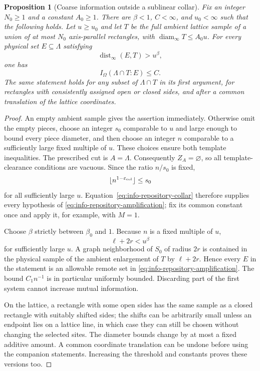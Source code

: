 \documentclass[11pt]{article}
\numberwithin{equation}{section}
\newtheorem{proposition}[theorem]{Proposition}
\theoremstyle{definition}
\theoremstyle{remark}
\DeclareMathOperator{\dist}{dist}
\DeclareMathOperator{\diam}{diam}
\begin{document}
\begin{proposition}[Coarse information outside a sublinear collar]
\label{prop:coarse}
Fix an integer $N_0\ge1$ and a constant $A_0\ge1$.  There are
$\beta<1$, $C<\infty$, and $u_0<\infty$ such that the following holds.
Let $u\ge u_0$ and let $T$ be the full ambient lattice sample of a union
of at most $N_0$ axis-parallel rectangles, with
$\diam_\infty T\le A_0u$.  For every physical set $E\subseteq\Lambda$
satisfying
\[
 \dist_\infty(E,T)>u^\beta,
\]
one has
\[
 I_\Omega(\Lambda\cap T:E)\le C.
\]
The same statement holds for any subset of $\Lambda\cap T$ in its first
argument, for rectangles with consistently assigned open or closed
sides, and after a common translation of the lattice coordinates.
\end{proposition}

\begin{proof}
An empty ambient sample gives the assertion immediately.  Otherwise
omit the empty pieces, choose an integer $s_0$ comparable to $u$ and
large enough to bound every piece diameter, and then choose an integer
$n$ comparable to a sufficiently large fixed multiple of $u$.  These
choices ensure both template inequalities.  The prescribed cut is
$A=\Lambda$.  Consequently $Z_A=\varnothing$, so all template-clearance
conditions are vacuous.  Since the ratio $n/s_0$ is fixed,
\[
 \lfloor n^{1-\varepsilon_{\rm col}}\rfloor\le s_0
\]
for all sufficiently large $u$.  Equation~\eqref{eq:info-repository-collar}
therefore supplies every hypothesis of
\eqref{eq:info-repository-amplification}; fix its common constant once
and apply it, for example, with $M=1$.

Choose $\beta$ strictly between $\beta_0$ and $1$.  Because $n$ is a
fixed multiple of $u$,
\[
 \ell+2r<u^\beta
\]
for sufficiently large $u$.  A graph neighborhood of $S_0$ of radius
$2r$ is contained in the physical sample of the ambient enlargement of
$T$ by $\ell+2r$.  Hence every $E$ in the statement is an allowable
remote set in \eqref{eq:info-repository-amplification}.  The bound
$C_1n^{-1}$ is in particular uniformly bounded.  Discarding part of the
first system cannot increase mutual information.

On the lattice, a rectangle with some open sides has the same sample
as a closed rectangle with suitably shifted sides; the shifts can be
arbitrarily small unless an endpoint lies on a lattice line, in which
case they can still be chosen without changing the selected sites.
The diameter bounds change by at most a fixed additive amount.  A
common coordinate translation can be undone before using the companion
statements.  Increasing the threshold and constants proves these
versions too.
\end{proof}
\end{document}

